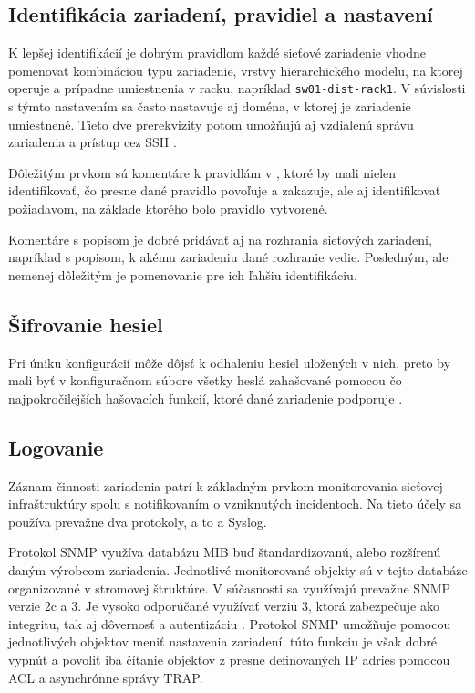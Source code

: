 \subsection*{Identifikácia zariadení, pravidiel a nastavení}
K lepšej identifikácií je dobrým pravidlom každé sieťové zariadenie vhodne pomenovať kombináciou typu zariadenie, vrstvy hierarchického modelu, na ktorej operuje a prípadne umiestnenia v racku, napríklad \texttt{sw01-dist-rack1}. V súvislosti s týmto nastavením sa často nastavuje aj doména, v ktorej je zariadenie umiestnené. Tieto dve prerekvizity potom umožňujú aj vzdialenú správu zariadenia a prístup cez SSH \cite{CIS_DrTLsgXv24lxeIIM}.

Dôležitým prvkom sú komentáre k pravidlám v , ktoré by mali nielen identifikovať, čo presne dané pravidlo povoľuje a zakazuje, ale aj identifikovať požiadavom, na základe ktorého bolo pravidlo vytvorené. 

Komentáre s popisom je dobré pridávať aj na rozhrania sieťových zariadení, napríklad s popisom, k akému zariadeniu dané rozhranie vedie. Posledným, ale nemenej dôležitým je pomenovanie  pre ich ľahšiu identifikáciu.

\subsection*{Šifrovanie hesiel}
Pri úniku konfigurácií môže dôjsť k odhaleniu hesiel uložených v nich, preto by mali byť v konfiguračnom súbore všetky heslá zahašované pomocou čo najpokročilejších hašovacích funkcií, ktoré dané zariadenie podporuje \cite{CIS_DrTLsgXv24lxeIIM}.

\subsection*{Logovanie}
Záznam činnosti zariadenia patrí k základným prvkom monitorovania sieťovej infraštruktúry spolu s notifikovaním o vzniknutých incidentoch. Na tieto účely sa používa prevažne dva protokoly, a to  a Syslog. 

Protokol SNMP využíva databázu MIB buď štandardizovanú, alebo rozšírenú daným výrobcom zariadenia. Jednotlivé monitorované objekty sú v tejto databáze organizované v stromovej štruktúre. V súčasnosti sa využívajú prevažne SNMP verzie 2c a 3. Je vysoko odporúčané využívať verziu 3, ktorá zabezpečuje ako integritu, tak aj dôvernosť a autentizáciu \cite{CIS_DrTLsgXv24lxeIIM} \cite{Graesser2001}. Protokol SNMP umožňuje pomocou jednotlivých objektov meniť nastavenia zariadení, túto funkciu je však dobré vypnúť a povoliť iba čítanie objektov z presne definovaných IP adries pomocou ACL a asynchrónne správy TRAP.   

